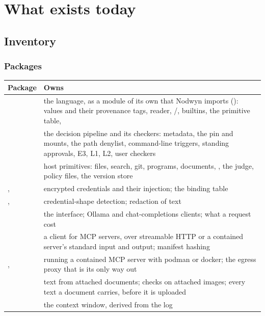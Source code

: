 \part{What exists today}

\chapter{Inventory}

\section{Packages}

{\small
\begin{longtable}{@{}L{4.8cm}L{10.2cm}@{}}
\toprule
Package & Owns \\
\midrule
\endhead
{} & the language, as a module of its own that Nodwyn imports (): values and their provenance tags, reader, /, builtins, the primitive table,  \\
 & the decision pipeline and its checkers: metadata, the pin and mounts, the path denylist, command-line triggers, standing approvals, E3, L1, L2, user checkers \\
 & host primitives: files, search, git, programs, documents, , the judge, policy files, the version store \\
,  & encrypted credentials and their injection; the binding table \\
,  & credential-shape detection; redaction of text \\
 & the  interface; Ollama and chat-completions clients; what a request cost \\
 & a client for MCP servers, over streamable HTTP or a contained server's standard input and output; manifest hashing \\
,  & running a contained MCP server with podman or docker; the egress proxy that is its only way out \\
 & text from attached documents; checks on attached images; every text a document carries, before it is uploaded \\
 & the context window, derived from the log \\

\end{longtable}}
